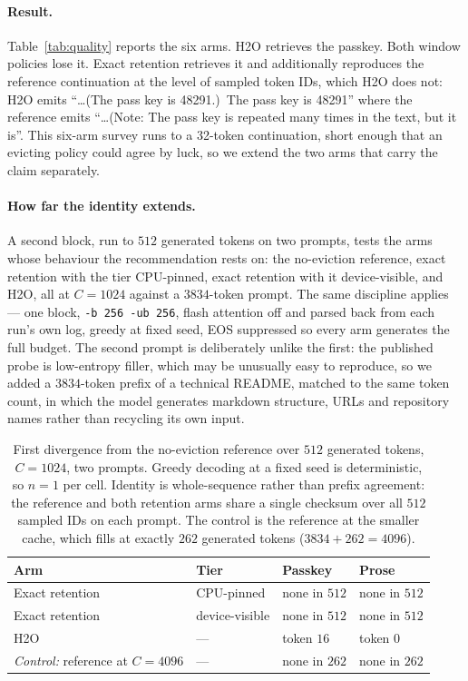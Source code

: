 \documentclass[manuscript,anonymous,review]{acmart}
\begin{document}
\paragraph{Result.} Table~\ref{tab:quality} reports the six arms. H2O
retrieves the passkey. Both window policies
lose it. Exact retention retrieves it and additionally reproduces the
reference continuation at the level of sampled token IDs, which H2O
does not: H2O emits ``\ldots(The pass key is 48291.)\ The pass key is
48291'' where the reference emits ``\ldots(Note: The pass key is
repeated many times in the text, but it is''. This six-arm survey runs
to a 32-token continuation, short enough that an evicting policy could
agree by luck, so we extend the two arms that carry the claim
separately.

\paragraph{How far the identity extends.} A second block, run to $512$
generated tokens on two prompts, tests the arms whose behaviour the
recommendation rests on: the no-eviction reference, exact retention
with the tier CPU-pinned, exact retention with it device-visible, and
H2O, all at $C = 1024$ against a $3834$-token prompt. The same
discipline applies --- one block, \texttt{-b 256 -ub 256}, flash
attention off and parsed back from each run's own log, greedy at fixed
seed, EOS suppressed so every arm generates the full budget. The
second prompt is deliberately unlike the first: the published probe is
low-entropy filler, which may be unusually easy to reproduce, so we
added a $3834$-token prefix of a technical README, matched to the same
token count, in which the model generates markdown structure, URLs and
repository names rather than recycling its own input.

\begin{table}[t]
  \centering
  \caption{First divergence from the no-eviction reference over $512$
  generated tokens, $C = 1024$, two prompts. Greedy decoding at a fixed
  seed is deterministic, so $n = 1$ per cell. Identity is
  whole-sequence rather than prefix agreement: the reference and both
  retention arms share a single checksum over all $512$ sampled IDs on
  each prompt. The control is the reference at the smaller cache, which
  fills at exactly $262$ generated tokens
  ($3834 + 262 = 4096$).}
  \label{tab:horizon}
  \renewcommand{\arraystretch}{1.25}
  \begin{tabular}{@{}llll@{}}
    \toprule
    \textbf{Arm} & \textbf{Tier} & \textbf{Passkey} & \textbf{Prose} \\
    \midrule
    Exact retention & CPU-pinned     & none in $512$ & none in $512$ \\
    Exact retention & device-visible & none in $512$ & none in $512$ \\
    H2O             & ---            & token $16$    & token $0$ \\
    \midrule
    \emph{Control:} reference at $C = 4096$ & --- & none in $262$ & none in $262$ \\
    \bottomrule
  \end{tabular}
\end{table}
\end{document}
